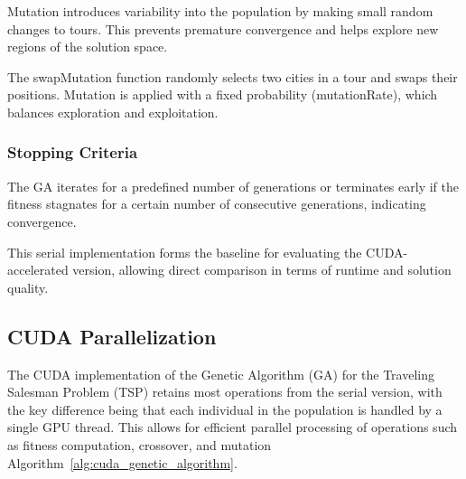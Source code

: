 \documentclass[conference]{IEEEtran}
\begin{document}
Mutation introduces variability into the population by making small random changes to tours. This prevents premature convergence and helps explore new regions of the solution space.

The swapMutation function randomly selects two cities in a tour and swaps their positions. Mutation is applied with a fixed probability (mutationRate), which balances exploration and exploitation.\\

\subsubsection{Stopping Criteria}

The GA iterates for a predefined number of generations or terminates early if the fitness stagnates for a certain number of consecutive generations, indicating convergence.



This serial implementation forms the baseline for evaluating the CUDA-accelerated version, allowing direct comparison in terms of runtime and solution quality.\\


\subsection{CUDA Parallelization}


The CUDA implementation of the Genetic Algorithm (GA) for the Traveling Salesman Problem (TSP) retains most operations from the serial version, with the key difference being that each individual in the population is handled by a single GPU thread. This allows for efficient parallel processing of operations such as fitness computation, crossover, and mutation Algorithm~\ref{alg:cuda_genetic_algorithm}.
\end{document}
